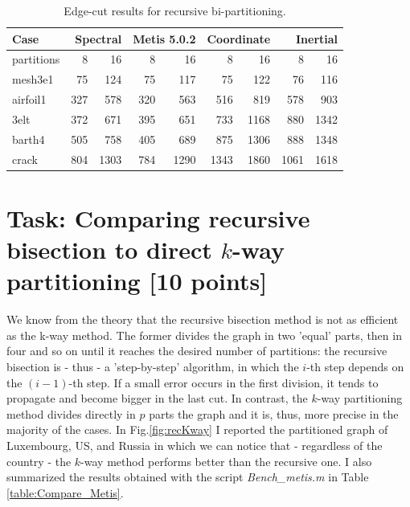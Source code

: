 \documentclass[unicode,11pt,a4paper,oneside,numbers=endperiod,openany]{scrartcl}
\begin{document}
\begin{table}[h]
\caption{Edge-cut results for recursive bi-partitioning.}
\centering
\begin{tabular}{|l|r|r|r|r|r|r|r|r|r|} \hline\hline 
\multicolumn{2}{|l|}{Case} & \multicolumn{2}{|r|}{Spectral} & \multicolumn{2}{|r|}{Metis 5.0.2} & \multicolumn{2}{|r|}{Coordinate} & \multicolumn{2}{|r|}{Inertial}    \\ 	
\hline
\multicolumn{2}{|l|}{partitions} & 8 & 16 & 8 & 16 & 8 & 16 & 8 & 16 \\
\hline
\multicolumn{2}{|l|}{mesh3e1} & 75 & 124 & 75 & 117 & 75 & 122 & 76 & 116 \\
\multicolumn{2}{|l|}{airfoil1} & 327 & 578 & 320 & 563 & 516 & 819 & 578 & 903 \\
\multicolumn{2}{|l|}{3elt} & 372 & 671 & 395 & 651 & 733 & 1168 & 880 & 1342 \\
\multicolumn{2}{|l|}{barth4} & 505 & 758 & 405 & 689 & 875 & 1306 & 888 & 1348 \\
\multicolumn{2}{|l|}{crack} & 804 & 1303 & 784 & 1290 & 1343 & 1860 & 1061 & 1618 \\
\hline 
\end{tabular}
\label{table:Rec_bisection}
\end{table}



\section{Task: Comparing recursive bisection to direct $k$-way partitioning [10 points]}
We know from the theory that the recursive bisection method is not as efficient as the k-way method. The former divides the graph in two 'equal' parts, then in four and so on until it reaches the desired number of partitions:  the recursive bisection is - thus - a 'step-by-step' algorithm, in which the $i$-th step depends on the $(i-1)$-th step. If a small error occurs in the first division, it tends to propagate and become bigger in the last cut. In contrast, the $k$-way partitioning method divides directly in $p$ parts the graph and it is, thus, more precise in the majority of the cases. In Fig.\ref{fig:recKway} I reported the partitioned graph of Luxembourg, US, and Russia in which we can notice that - regardless of the country - the $k$-way method performs better than the recursive one. I also summarized the results obtained with the script \textit{Bench\_metis.m} in Table \ref{table:Compare_Metis}.
\end{document}
